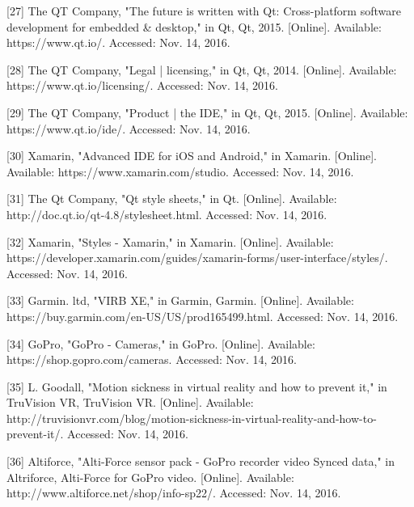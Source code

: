 \documentclass[10pt,draftclsnofoot,onecolumn]{IEEEtran}
\begin{document}
[27] The QT Company, "The future is written with Qt: Cross-platform software development for embedded & desktop," in Qt, Qt, 2015. [Online]. Available: https://www.qt.io/. Accessed: Nov. 14, 2016.\\
 \vspace{2mm}


[28] The QT Company, "Legal | licensing," in Qt, Qt, 2014. [Online]. Available: https://www.qt.io/licensing/. Accessed: Nov. 14, 2016.\\
 \vspace{2mm}


[29] The QT Company, "Product | the IDE," in Qt, Qt, 2015. [Online]. Available: https://www.qt.io/ide/. Accessed: Nov. 14, 2016.\\
 \vspace{2mm}


[30] Xamarin, "Advanced IDE for iOS and Android," in Xamarin. [Online]. Available: https://www.xamarin.com/studio. Accessed: Nov. 14, 2016.\\
 \vspace{2mm}


[31] The Qt Company, "Qt style sheets," in Qt. [Online]. Available: http://doc.qt.io/qt-4.8/stylesheet.html. Accessed: Nov. 14, 2016.\\
 \vspace{2mm}


[32] Xamarin, "Styles - Xamarin," in Xamarin. [Online]. Available: https://developer.xamarin.com/guides/xamarin-forms/user-interface/styles/. Accessed: Nov. 14, 2016.\\
 \vspace{2mm}


[33] Garmin. ltd, "VIRB XE," in Garmin, Garmin. [Online]. Available: https://buy.garmin.com/en-US/US/prod165499.html. Accessed: Nov. 14, 2016.\\
 \vspace{2mm}


[34] GoPro, "GoPro - Cameras," in GoPro. [Online]. Available: https://shop.gopro.com/cameras. Accessed: Nov. 14, 2016.\\
 \vspace{2mm}


[35] L. Goodall, "Motion sickness in virtual reality and how to prevent it," in TruVision VR, TruVision VR. [Online]. Available: http://truvisionvr.com/blog/motion-sickness-in-virtual-reality-and-how-to-prevent-it/. Accessed: Nov. 14, 2016.\\
 \vspace{2mm}


[36] Altiforce, "Alti-Force sensor pack - GoPro recorder video Synced data," in Altriforce, Alti-Force for GoPro video. [Online]. Available: http://www.altiforce.net/shop/info-sp22/. Accessed: Nov. 14, 2016.\\
\end{document}
